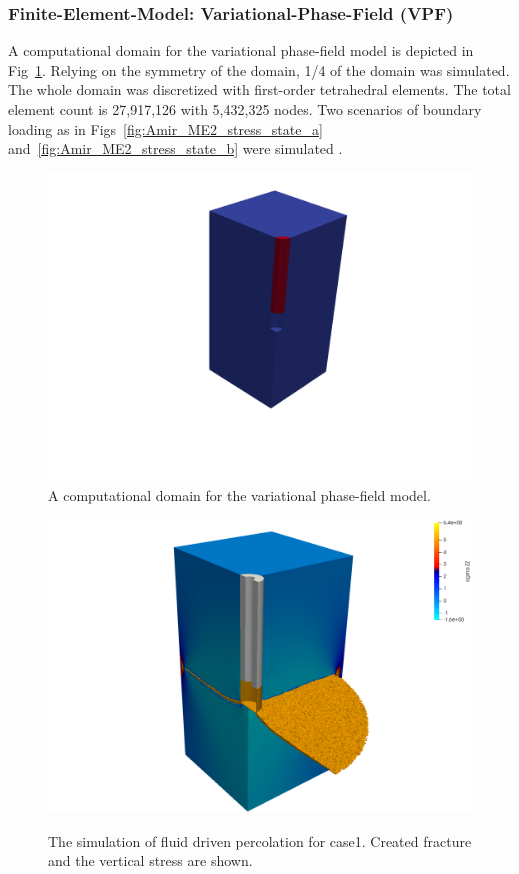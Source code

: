 \subsubsection*{Finite-Element-Model: Variational-Phase-Field (VPF)}
A computational domain for the variational phase-field model is depicted in Fig~\ref{fig:VPF_init}.
Relying on the symmetry of the domain, 1/4 of the domain was simulated. 
The whole domain was discretized with first-order tetrahedral elements.
The total element count is 27,917,126 with 5,432,325 nodes.
Two scenarios of boundary loading as in Figs~\ref{fig:Amir_ME2_stress_state_a} and~\ref{fig:Amir_ME2_stress_state_b} were simulated  .

\begin{figure}[!ht]
\centering
\includegraphics[width=1.0\textwidth]{figures/VPF_init.png}
\caption{A computational domain for the variational phase-field model.}
\label{fig:VPF_init}
\end{figure}

\begin{figure}[!ht]
\includegraphics[width=1\textwidth]{figures/VPF_ME2_case1.png}
\label{fig:Keita_ME2_VPF_case1}
\caption{The simulation of fluid driven percolation for case1. Created fracture and the vertical stress are shown.}
\end{figure}

